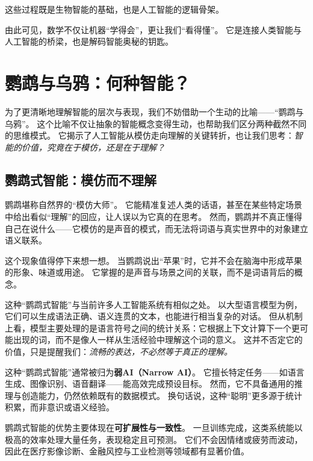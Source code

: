 这些过程既是生物智能的基础，也是人工智能的逻辑骨架。

由此可见，数学不仅让机器“学得会”，更让我们“看得懂”。  
它是连接人类智能与人工智能的桥梁，也是解码智能奥秘的钥匙。  


\section{鹦鹉与乌鸦：何种智能？}

为了更清晰地理解智能的层次与表现，我们不妨借助一个生动的比喻——“鹦鹉与乌鸦”。
这个比喻不仅让抽象的智能概念变得生动，也帮助我们区分两种截然不同的思维模式。  
它揭示了人工智能从模仿走向理解的关键转折，也让我们思考：\emph{智能的价值，究竟在于模仿，还是在于理解？}

\subsection{鹦鹉式智能：模仿而不理解}

鹦鹉堪称自然界的“模仿大师”。  
它能精准复述人类的话语，甚至在某些特定场景中给出看似“理解”的回应，让人误以为它真的在思考。  
然而，鹦鹉并不真正懂得自己在说什么——它模仿的是声音的模式，而无法将词语与真实世界中的对象建立语义联系。  
  
这个现象值得停下来想一想。  
当鹦鹉说出“苹果”时，它并不会在脑海中形成苹果的形象、味道或用途。  
它掌握的是声音与场景之间的关联，而不是词语背后的概念。

这种“鹦鹉式智能”与当前许多人工智能系统有相似之处。  
以大型语言模型为例，它们可以生成语法正确、语义连贯的文本，也能进行相当复杂的对话。  
但从机制上看，模型主要处理的是语言符号之间的统计关系：它根据上下文计算下一个更可能出现的词，而不是像人一样从生活经验中理解这个词的意义。  
这并不否定它的价值，只是提醒我们：\emph{流畅的表达，不必然等于真正的理解。}
  
这种“鹦鹉式智能”通常被归为\textbf{弱AI（Narrow AI）}。  
它擅长特定任务——如语言生成、图像识别、语音翻译——能高效完成预设目标。  
然而，它不具备通用的推理与创造能力，仍然依赖既有的数据模式。  
换句话说，这种“聪明”更多源于统计积累，而非意识或语义经验。  

鹦鹉式智能的优势主要体现在\textbf{可扩展性与一致性}。  
一旦训练完成，这类系统能以极高的效率处理大量任务，表现稳定且可预测。  
它们不会因情绪或疲劳而波动，因此在医疗影像诊断、金融风控与工业检测等领域都有显著价值。  


